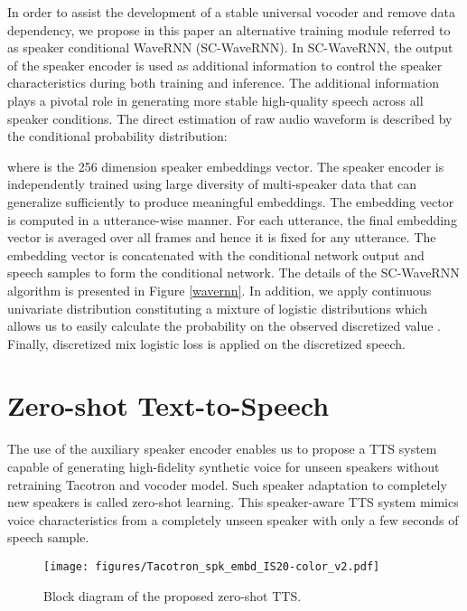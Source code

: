 \documentclass[a4paper]{article}
\begin{document}
In order to assist the development of a stable universal vocoder and remove data dependency, we propose in this paper an alternative training module referred to as speaker conditional WaveRNN (SC-WaveRNN). In SC-WaveRNN, the output of the speaker encoder is used as additional information to control the speaker characteristics during both training and inference. The additional information plays a pivotal role in generating more stable high-quality speech across all speaker conditions. The direct estimation of raw audio waveform  is described by the conditional probability distribution:
\vspace{-2mm}

where  is the 256 dimension speaker embeddings vector. The speaker encoder is independently trained using large diversity of multi-speaker data that can generalize sufficiently to produce meaningful embeddings. The embedding vector  is computed in a utterance-wise manner. For each utterance, the final embedding vector is averaged over all frames and hence it is fixed for any utterance. The embedding vector is concatenated with the conditional network output and speech samples to form the conditional network. The details of the SC-WaveRNN algorithm is presented in Figure \ref{wavernn}. In addition, we apply continuous univariate distribution constituting a mixture of logistic distributions \cite{oord2017parallel} which allows us to easily calculate the probability on the observed discretized value . Finally, discretized mix logistic loss is applied on the discretized speech.

\vspace{-2mm}
\section{Zero-shot Text-to-Speech}

The use of the auxiliary speaker encoder enables us to propose a TTS system capable of generating high-fidelity synthetic voice for unseen speakers without retraining Tacotron and vocoder model. Such speaker adaptation to completely new speakers is called zero-shot learning. This speaker-aware TTS system mimics voice characteristics from a completely unseen speaker with only a few seconds of speech sample.

\begin{figure}[h!]
  \begin{center}
  \vspace{-4mm}
    \texttt{[image: figures/Tacotron\_spk\_embd\_IS20-color\_v2.pdf]}
    \vspace{-10mm}
  \end{center}
  \caption{\small Block diagram of the proposed zero-shot TTS.}
  \vspace{-3mm}
  \label{tts}
\end{figure}
\end{document}
